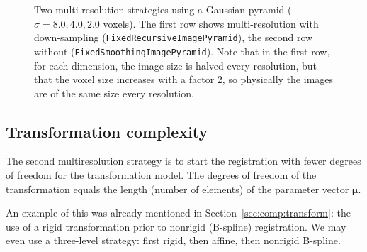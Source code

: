 \documentclass[]{report}
\newcommand{\vmu}{\bm{\mu}}
\begin{document}
\begin{figure}[tb]
\caption{Two multi-resolution strategies using a Gaussian pyramid
($\sigma = 8.0, 4.0, 2.0$ voxels). The first row shows
multi-resolution with down-sampling
(\texttt{FixedRecursiveImagePyramid}), the second row without
(\texttt{FixedSmoothingImagePyramid}). Note that in the first row,
for each dimension, the image size is halved every resolution, but
that the voxel size increases with a factor 2, so physically the
images are of the same size every resolution.}
\label{fig:multiresolution}
\end{figure}

\subsection{Transformation complexity}

The second multiresolution strategy is to start the registration
with fewer degrees of freedom for the transformation model. The
degrees of freedom of the transformation equals the length (number
of elements) of the parameter vector $\vmu$.

An example of this was already mentioned in Section~\ref{sec:comp:transform}:
the use of a rigid transformation prior to nonrigid (B-spline) registration. We
may even use a three-level strategy: first rigid, then affine, then nonrigid
B-spline.
\end{document}

